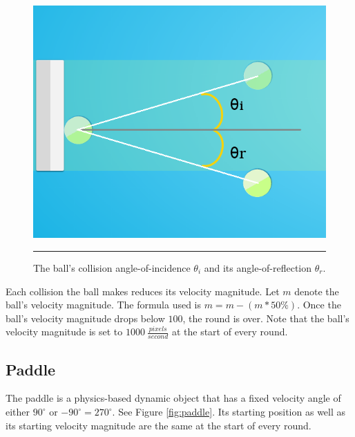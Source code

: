\begin{figure}[htbp]  
  \centering
  \includegraphics[scale=0.5]{../Figures/Chapter3/angle.png}
  \rule{35em}{0.5pt}
  \caption[SimPL Angle of Incidence]{The ball's collision angle-of-incidence $\theta_i$ and its angle-of-reflection $\theta_r$.}
  \label{fig:angle}
\end{figure}

Each collision the ball makes reduces its velocity magnitude. Let $m$ denote the ball's velocity magnitude. The formula used is $m = m - (m * 50\%)$. Once the ball's velocity magnitude drops below $100$, the round is over. Note that the ball's velocity magnitude is set to $1000 \ \frac{pixels}{second}$ at the start of every round.

\pagebreak

\subsection{Paddle}

The paddle is a physics-based dynamic object that has a fixed velocity angle of either $90^\circ$ or $-90^\circ=270^\circ$. See Figure \ref{fig:paddle}. Its starting position as well as its starting velocity magnitude are the same at the start of every round. 

